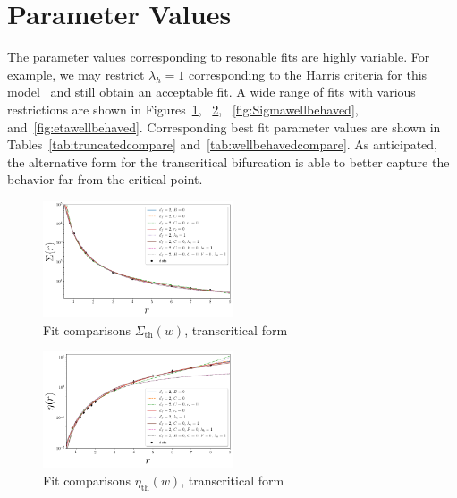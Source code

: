 \documentclass[reprint,amsmath,amssymb,aps,floatfix]{revtex4-1}
\begin{document}
\section{\label{app:goodfits} Parameter Values}
The parameter values corresponding to resonable fits are highly variable. For example, we may restrict $\lambda_h=1$ corresponding to the Harris criteria for this model~\cite{Perkovic96} and still obtain an acceptable fit.  A wide range of fits with various restrictions are shown in Figures~\ref{fig:Sigmatruncated}, ~\ref{fig:etatruncated}, ~\ref{fig:Sigmawellbehaved}, and~\ref{fig:etawellbehaved}. Corresponding best fit parameter values are shown in Tables~\ref{tab:truncatedcompare} and~\ref{tab:wellbehavedcompare}. As anticipated, the alternative form for the transcritical bifurcation is able to better capture the behavior far from the critical point.
%
\begin{figure}
	\includegraphics[width=0.5\textwidth]{Sigma_truncated_comparison.png}
	\caption{Fit comparisons $\Sigma_{\textrm{th}}(w)$, transcritical form}	
	\label{fig:Sigmatruncated}
\end{figure}
%
\begin{figure}
	\includegraphics[width=0.5\textwidth]{eta_truncated_comparison.png}
	\caption{Fit comparisons $\eta_{\textrm{th}}(w)$, transcritical form}
	\label{fig:etatruncated}
\end{figure}
%
\end{document}
